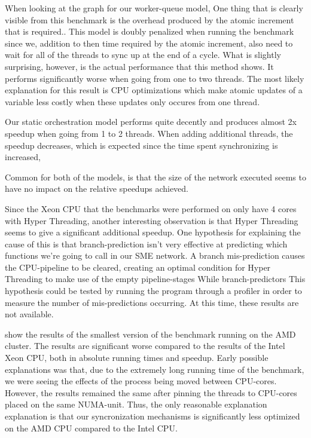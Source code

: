 When looking at the graph for our worker-queue model, One thing that
is clearly visible from this benchmark is the overhead produced by the
atomic increment that is required.. This model is doubly penalized
when running the benchmark since we, addition to then time required by
the atomic increment, also need to wait for all of the threads to sync
up at the end of a cycle. What is slightly surprising, however, is the
actual performance that this method shows. It performs significantly
worse when going from one to two threads. The most likely explanation
for this result is CPU optimizations which make atomic updates of a
variable less costly when these updates only occures from one thread.

Our static orchestration model performs quite decently and produces
almost 2x speedup when going from 1 to 2 threads. When adding
additional threads, the speedup decreases, which is expected since the
time spent synchronizing is increased, 

Common for both of the models, is that the size of the network
executed seems to have no impact on the relative speedups achieved.

Since the Xeon CPU that the benchmarks were performed on only have 4
cores with Hyper Threading, another interesting observation is that
Hyper Threading seems to give a significant additional speedup. One
hypothesis for explaining the cause of this is that branch-prediction
isn't very effective at predicting which functions we're going to call
in our SME network. A branch mis-prediction causes the CPU-pipeline to
be cleared, creating an optimal condition for Hyper Threading to make
use of the empty pipeline-stages\cite{fog2014microarchitecture} While
branch-predictors This hypothesis could be tested by running the
program through a profiler in order to measure the number of
mis-predictions occurring. At this time, these results are not
available.

 show the results of the smallest version of the
benchmark running on the AMD cluster. The results are significant
worse compared to the results of the Intel Xeon CPU, both in absolute
running times  and
speedup. Early possible explanations was that, due to the extremely
long running time of the benchmark, we were seeing the effects of the
process being moved between CPU-cores. However, the results remained
the same after pinning the threads to CPU-cores placed on the same
NUMA-unit. Thus, the only reasonable explanation explanation is that our
syncronization mechanisms is significantly less optimized on the AMD
CPU compared to the Intel CPU.

